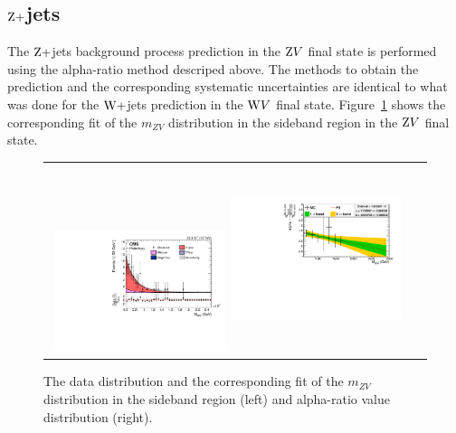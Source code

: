 \subsection{$\mathrm{Z}+$jets}
The $\mathrm{Z}+$jets background process prediction in the $\mathrm{Z} V$ final state is performed using the alpha-ratio method descriped above. The methods to obtain the prediction and the corresponding systematic uncertainties are identical to what was done for the $\mathrm{W}+$jets prediction in the $\mathrm{W} V$ final state. Figure~\ref{fig:zvfits} shows the corresponding fit of the $m_{ZV}$ distribution in the sideband region in the $\mathrm{Z} V$ final state.  

\begin{figure}[!htbp] 
	 \centering 
	 \begin{tabular}{cc}
	 \includegraphics[width=0.48\textwidth]{Plots/BackgroundEstimation/ZV/m_lvj_fitting/m_lvj_sb_lo_WJets0_xww__with_pull.pdf}
	 \includegraphics[width=0.48\textwidth,height=5.5cm]{Plots/BackgroundEstimation/ZV/ZVchannel_AlphaDistribution_AfterFit_New.pdf}
	 \end{tabular}
	 \caption{The data distribution and the corresponding fit of the $m_{ZV}$ distribution in the sideband region (left) and alpha-ratio value distribution (right).}
	 \label{fig:zvfits}
\end{figure}



